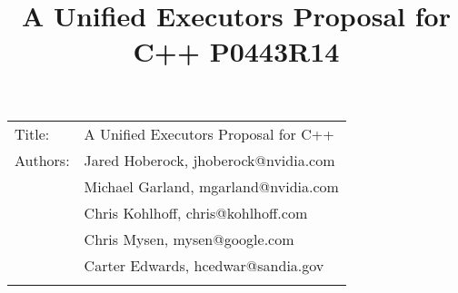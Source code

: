 \documentclass[a4paper,12pt,notitlepage,twoside,openright]{article}
\title{A Unified Executors Proposal for C++ \textbar{} P0443R14}
\author{}
\date{}
\begin{document}
\maketitle

\begin{longtable}[]{@{}ll@{}}
\toprule
\endhead
\begin{minipage}[t]{0.26\columnwidth}\raggedright
Title:\strut
\end{minipage} & \begin{minipage}[t]{0.50\columnwidth}\raggedright
A Unified Executors Proposal for C++\strut
\end{minipage}\tabularnewline
\begin{minipage}[t]{0.26\columnwidth}\raggedright
Authors:\strut
\end{minipage} & \begin{minipage}[t]{0.50\columnwidth}\raggedright
Jared Hoberock, jhoberock@nvidia.com\strut
\end{minipage}\tabularnewline
\begin{minipage}[t]{0.26\columnwidth}\raggedright
\strut
\end{minipage} & \begin{minipage}[t]{0.50\columnwidth}\raggedright
Michael Garland, mgarland@nvidia.com\strut
\end{minipage}\tabularnewline
\begin{minipage}[t]{0.26\columnwidth}\raggedright
\strut
\end{minipage} & \begin{minipage}[t]{0.50\columnwidth}\raggedright
Chris Kohlhoff, chris@kohlhoff.com\strut
\end{minipage}\tabularnewline
\begin{minipage}[t]{0.26\columnwidth}\raggedright
\strut
\end{minipage} & \begin{minipage}[t]{0.50\columnwidth}\raggedright
Chris Mysen, mysen@google.com\strut
\end{minipage}\tabularnewline
\begin{minipage}[t]{0.26\columnwidth}\raggedright
\strut
\end{minipage} & \begin{minipage}[t]{0.50\columnwidth}\raggedright
Carter Edwards, hcedwar@sandia.gov\strut
\end{minipage}\tabularnewline
\begin{minipage}[t]{0.26\columnwidth}\raggedright
\strut
\end{minipage} & \begin{minipage}[t]{0.50\columnwidth}\raggedright

\end{minipage}
\end{longtable}
\end{document}
